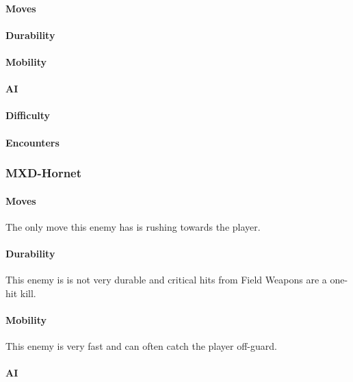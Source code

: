 \documentclass[12pt]{article}
\begin{document}
\paragraph{Moves}

\paragraph{Durability}

\paragraph{Mobility}

\paragraph{AI}

\paragraph{Difficulty}

\paragraph{Encounters}

\subsubsection{MXD-Hornet}

\paragraph{Moves}

The only move this enemy has is rushing towards the player.

\paragraph{Durability}

This enemy is is not very durable and critical hits from Field Weapons are a one-hit kill.

\paragraph{Mobility}

This enemy is very fast and can often catch the player off-guard. 

\paragraph{AI}
\end{document}
